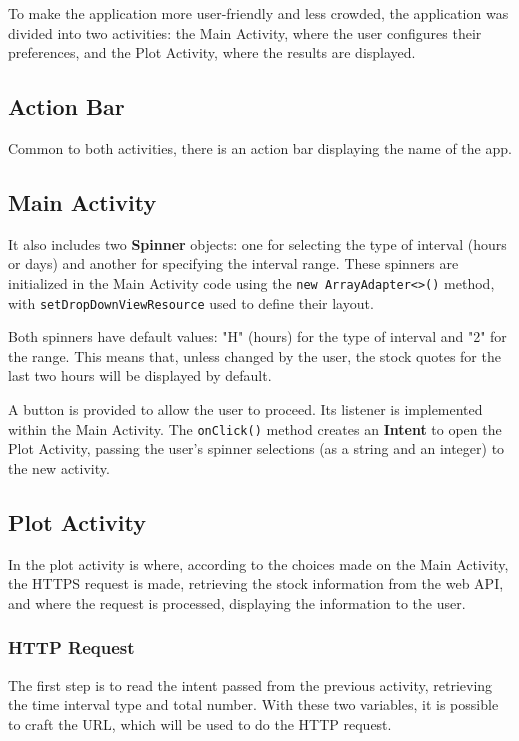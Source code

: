 \documentclass{article}
\begin{document}
To make the application more user-friendly and less crowded, the application was divided into two activities: the Main Activity, where the user configures their preferences, and the Plot Activity, where the results are displayed.

\subsection{Action Bar}
Common to both activities, there is an action bar displaying the name of the app. 

\subsection{Main Activity}
\label{sec:Main Activity Java}

It also includes two \textbf{Spinner} objects: one for selecting the type of interval (hours or days) and another for specifying the interval range. 
These spinners are initialized in the Main Activity code using the \texttt{new ArrayAdapter<>()} method, with \texttt{setDropDownViewResource} used to define their layout.

Both spinners have default values: "H" (hours) for the type of interval and "2" for the range. 
This means that, unless changed by the user, the stock quotes for the last two hours will be displayed by default.

A button is provided to allow the user to proceed. Its listener is implemented within the Main Activity. The \texttt{onClick()} method creates an \textbf{Intent} to open the Plot Activity, passing the user's spinner selections (as a string and an integer) to the new activity.

\subsection{Plot Activity}
In the plot activity is where, according to the choices made on the Main Activity, the HTTPS request is made, retrieving the stock information from the web API, and where the request is processed, displaying the information to the user.

\subsubsection{HTTP Request}
The first step is to read the intent passed from the previous activity, retrieving the time interval type and total number.
With these two variables, it is possible to craft the URL, which will be used to do the HTTP request.
\end{document}
